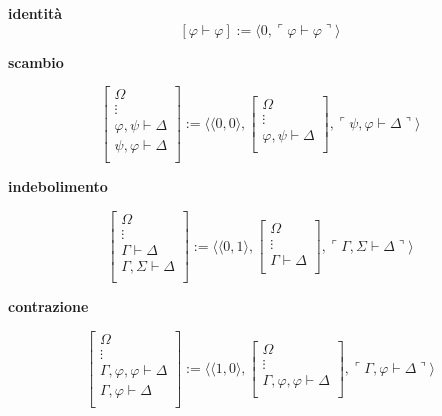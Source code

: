 \vspace{0.5cm}
\textbf{identit\`a}
$$
[ \varphi \vdash \varphi ] := \langle 0, \ulcorner \varphi \vdash \varphi \urcorner \rangle
$$

\vspace{0.5cm}

\textbf{scambio}

$$
\left [
\begin{array}{c}
\Omega\\
\vdots\\
\varphi, \psi \vdash \Delta\\
\hline
\psi, \varphi \vdash \Delta\\
\end{array}
\right ]
:= \langle \langle 0, 0\rangle ,
\left [
\begin{array}{c}
\Omega\\
\vdots\\
\varphi, \psi \vdash \Delta\\
\end{array}
\right ],
\ulcorner \psi, \varphi \vdash \Delta \urcorner \rangle
$$

\vspace{0.5cm}

\textbf{indebolimento}

$$
\left [
\begin{array}{c}
\Omega\\
\vdots\\
\Gamma \vdash \Delta\\
\hline
\Gamma, \Sigma \vdash \Delta\\
\end{array}
\right ]
:= \langle \langle 0, 1 \rangle ,
\left [
\begin{array}{c}
\Omega\\
\vdots\\
\Gamma \vdash \Delta\\
\end{array}
\right ],
\ulcorner \Gamma, \Sigma \vdash \Delta \urcorner \rangle
$$

\vspace{0.5cm}

\textbf{contrazione}

$$
\left [
\begin{array}{c}
\Omega\\
\vdots\\
\Gamma, \varphi, \varphi \vdash \Delta\\
\hline
\Gamma, \varphi \vdash \Delta\\
\end{array}
\right ]
:= \langle \langle 1, 0 \rangle ,
\left [
\begin{array}{c}
\Omega\\
\vdots\\
\Gamma, \varphi, \varphi \vdash \Delta\\
\end{array}
\right ],
\ulcorner \Gamma, \varphi \vdash \Delta \urcorner \rangle
$$

